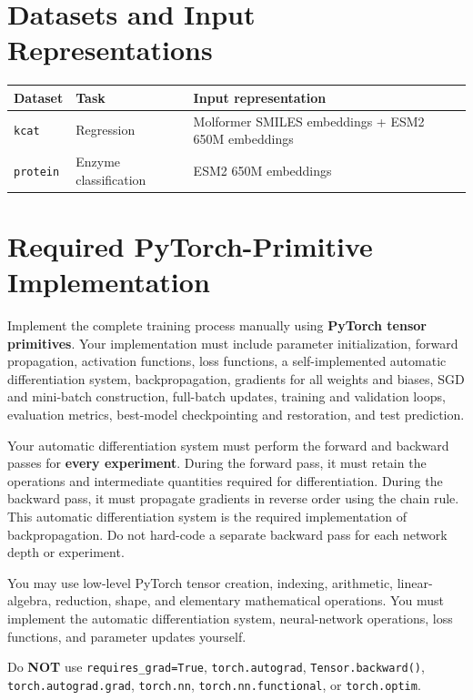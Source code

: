 \documentclass[11pt,a4paper]{article}
\newcommand{\code}[1]{\texttt{#1}}
\begin{document}
\section{Datasets and Input Representations}

\begin{center}
\begin{tabular}{p{} p{} p{}}
\toprule
\textbf{Dataset} & \textbf{Task} & \textbf{Input representation} \\
\midrule
\code{kcat} & Regression & Molformer SMILES embeddings + ESM2 650M embeddings \\
\code{protein} & Enzyme classification & ESM2 650M embeddings \\
\bottomrule
\end{tabular}
\end{center}

\section{Required PyTorch-Primitive Implementation}

Implement the complete training process manually using \textbf{PyTorch tensor primitives}. Your implementation must include parameter initialization, forward propagation, activation functions, loss functions, a self-implemented automatic differentiation system, backpropagation, gradients for all weights and biases, SGD and mini-batch construction, full-batch updates, training and validation loops, evaluation metrics, best-model checkpointing and restoration, and test prediction.

Your automatic differentiation system must perform the forward and backward passes for \textbf{every experiment}. During the forward pass, it must retain the operations and intermediate quantities required for differentiation. During the backward pass, it must propagate gradients in reverse order using the chain rule. This automatic differentiation system is the required implementation of backpropagation. Do not hard-code a separate backward pass for each network depth or experiment.

You may use low-level PyTorch tensor creation, indexing, arithmetic,
linear-algebra, reduction, shape, and elementary mathematical operations. You must implement the automatic differentiation system, neural-network operations, loss functions, and parameter updates yourself.

Do \textbf{NOT} use \code{requires\_grad=True}, \code{torch.autograd},
\code{Tensor.backward()}, \code{torch.autograd.grad}, \code{torch.nn},
\code{torch.nn.functional}, or \code{torch.optim}.
\end{document}
